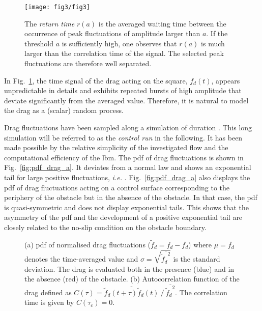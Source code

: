 \begin{figure}
	\centering
	\texttt{[image: fig3/fig3]}
	\caption{
	 The \textit{return time} $r(a)$  is the averaged waiting time between the occurrence of peak fluctuations of amplitude larger than $a$. If the threshold $a$ is sufficiently high, one observes that $r(a)$ is much larger than the correlation time of the signal. The selected peak fluctuations are therefore well separated.}
		\label{fig:illustrate_return_time}
\end{figure}


%
In Fig.~\ref{fig:illustrate_return_time},
the time signal of the drag acting on the square, $f_d(t)$, appears unpredictable in details and exhibits repeated bursts of high amplitude that deviate significantly from the averaged value.
Therefore, it is natural to model the drag as a (scalar) random process.

Drag fluctuations have been sampled along a simulation of duration .
This long simulation will be referred to as the \textit{control run} in the following.
It has been made possible by the relative simplicity of the investigated flow and the computational efficiency of the \ac{lbm}.
The \ac{pdf} of drag fluctuations is shown in Fig.~\ref{fig:pdf_drag_a}.
It deviates from a normal law and shows an exponential tail for large positive fluctuations, \textit{i.e.}  .
%
Fig.~\ref{fig:pdf_drag_a} also displays the \ac{pdf} of drag fluctuations acting on a control surface corresponding to the periphery of the obstacle but in the absence of the obstacle. 
%
In that case, the \ac{pdf} is quasi-symmetric and does not display exponential tails. This shows that the asymmetry of the \ac{pdf} and the development of a positive exponential tail are closely related to the no-slip condition on the obstacle boundary.
\begin{figure}
	\centering
	\caption{{(a)} \ac{pdf} of normalised drag fluctuations ($\tilde f_d = f_d - \bar{f_d}$) where $\mu = \bar{f_d}$ denotes the time-averaged value and $\sigma = \sqrt{\overline{{\tilde f_d}^2}}$ is the standard deviation. The drag is evaluated both in the presence (blue) and in the absence (red) of the obstacle. %
		{(b)} Autocorrelation function of the drag defined as $C(\tau) = \overline{ \tilde f_d(t+\tau)\tilde f_d(t)} ~/~ \overline{{\tilde f_d}^2}$. The correlation time  is given by $C(\tau_c)=0$.
	}
	\label{fig:pdf_drag}
\end{figure}

